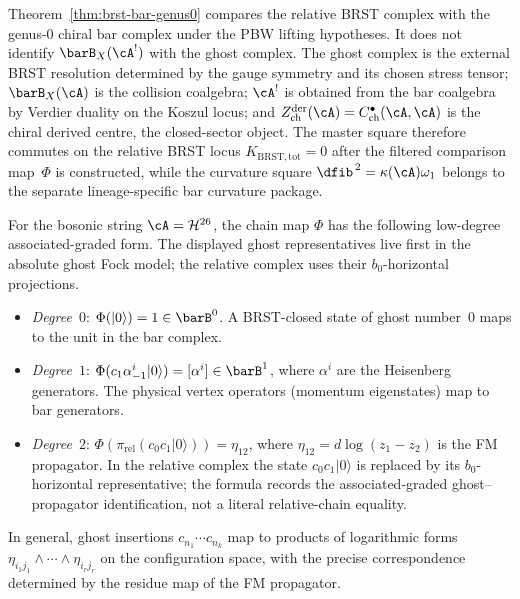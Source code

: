 \begin{remark}
\label{rem:bv-convergence}
Theorem~\ref{thm:brst-bar-genus0} compares the relative BRST complex
with the genus-$0$ chiral bar complex under the PBW lifting
hypotheses. It does not identify $\barB_X(\cA^!)$ with the ghost
complex. The ghost complex is the external BRST resolution determined
by the gauge symmetry and its chosen stress tensor; $\barB_X(\cA)$ is
the collision coalgebra; $\cA^!$ is obtained from the bar coalgebra by
Verdier duality on the Koszul locus; and
$Z^{\mathrm{der}}_{\mathrm{ch}}(\cA)
=C^\bullet_{\mathrm{ch}}(\cA,\cA)$ is the chiral derived centre, the
closed-sector object. The master square therefore commutes on the relative
BRST locus $K_{\mathrm{BRST,tot}}=0$ after the filtered comparison
map~$\Phi$ is constructed, while the curvature square
$\dfib^{\,2}=\kappa(\cA)\omega_1$ belongs to the separate
lineage-specific bar curvature package.
\end{remark}

\begin{remark}
\label{rem:brst-bar-explicit}
For the bosonic string $\cA = \mathcal{H}^{26}$, the chain map
$\Phi$ has the following low-degree associated-graded form. The
displayed ghost representatives live first in the absolute ghost Fock
model; the relative complex uses their $b_0$-horizontal projections.
\begin{itemize}
\item \emph{Degree~$0$}: $\Phi(|0\rangle) = 1 \in \barB^0$.
 A BRST-closed state of ghost number~$0$ maps to the unit in
 the bar complex.
\item \emph{Degree~$1$}: $\Phi(c_1 \alpha_{-1}^i |0\rangle)
 = [\alpha^i] \in \barB^1$, where $\alpha^i$ are the Heisenberg
 generators. The physical vertex operators (momentum eigenstates)
 map to bar generators.
\item \emph{Degree~$2$}:
$\Phi(\pi_{\mathrm{rel}}(c_0 c_1 |0\rangle)) = \eta_{12}$,
 where $\eta_{12} = d\log(z_1 - z_2)$ is the FM propagator.
 In the relative complex the state $c_0c_1|0\rangle$ is replaced
 by its $b_0$-horizontal representative; the formula records the
 associated-graded ghost--propagator identification, not a literal
 relative-chain equality.
\end{itemize}
In general, ghost insertions $c_{n_1} \cdots c_{n_k}$ map to
products of logarithmic forms $\eta_{i_1 j_1} \wedge \cdots \wedge
\eta_{i_r j_r}$ on the configuration space, with the precise
correspondence determined by the residue map of the FM propagator.
\end{remark}

